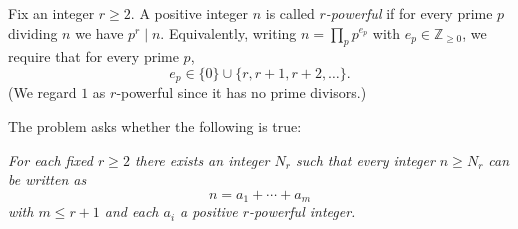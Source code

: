Fix an integer $r\ge 2$. A positive integer $n$ is called \emph{$r$-powerful} if for every prime $p$ dividing $n$ we have $p^r\mid n$.
Equivalently, writing $n=\prod_{p} p^{e_p}$ with $e_p\in\mathbb{Z}_{\ge 0}$, we require that for every prime $p$,
\[e_p\in\{0\}\cup\{r,r+1,r+2,\dots\}.\]
(We regard $1$ as $r$-powerful since it has no prime divisors.)

The problem asks whether the following is true:

\emph{For each fixed $r\ge 2$ there exists an integer $N_r$ such that every integer $n\ge N_r$ can be written as}
\[n=a_1+\cdots+a_m\]
\emph{with $m\le r+1$ and each $a_i$ a positive $r$-powerful integer.}
